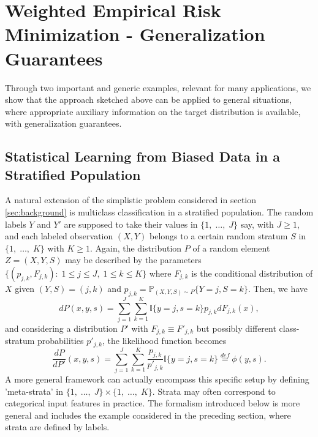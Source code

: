 \documentclass[12pt]{article}
\begin{document}
 

\section{Weighted Empirical Risk Minimization - Generalization Guarantees}
\label{sec:main}

Through two important and generic examples, relevant for many applications, we show that the approach sketched above can be applied to general situations, where appropriate auxiliary information on the target distribution is available, with generalization guarantees. 

\subsection{Statistical Learning from Biased Data in a Stratified Population}\label{sec:stratified_population}

A natural extension of the simplistic problem considered in section \ref{sec:background} is multiclass classification in a stratified population. The random labels $Y$ and $Y'$ are supposed to take their values in $\{1,\; \ldots,\; J\}$ say, with $J \geq 1$, and each labeled observation $(X,Y)$ belongs to a certain random stratum $S$ in $\{1,\; \ldots,\; K \}$ with $K\geq 1$. Again, the distribution $P$ of a random element $Z=(X,Y,S)$ may be described by the parameters $\{(p_{j,k},F_{j,k} ):\; 1 \leq j \leq J,\; 1 \leq k \leq K\}$ where $F_{j,k}$  is the conditional distribution of $X$ given $(Y,S)=(j,k)$ and $p_{j,k} = \mathbb{P}_{(X,Y,S)\sim P}\{Y=j, S=k\}$. Then, we have
$$
dP(x, y, s) =
\sum_{j=1}^J \sum_{k=1}^K \mathbb{I}\{y=j, s=k\} p_{j,k} dF_{j,k}(x),
$$
and considering a distribution $P'$ with $F_{j,k} \equiv F'_{j,k}$ but possibly different class-stratum probabilities $p'_{j,k}$, the likelihood function becomes
$$
    \frac{dP}{dP'}(x,y,s)=
    \sum_{j=1}^J \sum_{k=1}^K  \frac{p_{j,k}}{p'_{j,k}} \mathbb{I}\{ y=j,s=k\}
    \overset{def}{=} \phi(y,s).
$$
A more general framework can actually encompass this specific setup by
defining 'meta-strata' in $\{1,\; \ldots,\; J\}\times \{1,\; \ldots,\; K\}$.
Strata may often correspond to categorical input features in practice. The
formalism introduced below is more general and includes the example considered
in the preceding section, where strata are defined by labels.
\end{document}
